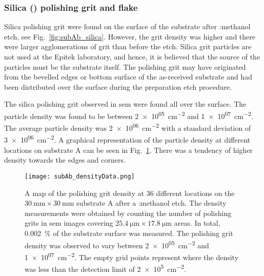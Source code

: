 \subsubsection{Silica () polishing grit and flake}

Silica polishing grit were found on the surface of the substrate after :methanol etch, see Fig.~\ref{fig:subAb_silica}. However, the grit density was higher and there were larger agglomerations of grit than before the etch. Silica grit particles are not used at the Epitek laboratory, and hence, it is believed that the source of the particles must be the substrate itself. The polishing grit may have originated from the bevelled edges or bottom surface of the as-received substrate and had been distributed over the surface during the preparation etch procedure.


The silica polishing grit observed in \ac{sem} were found all over the surface. The particle density was found to be between \SI{2e+05}{\centi\metre^{-2}} and \SI{1e+07}{\centi\metre^{-2}}. The average particle density was \SI{2e+06}{\centi\metre^{-2}} with a standard deviation of \SI{3e+06}{\centi\metre^{-2}}. A graphical representation of the particle density at different locations on substrate A can be seen in Fig.~\ref{fig:subAb_densityData}. There was a tendency of higher density towards the edges and corners.

\begin{figure}[htbp]
    \centering
    \texttt{[image: subAb\_densityData.png]}
    \caption[Map of the polishing grit density on substrate A after a :methanol etch.]{A map of the polishing grit density at 36 different locations on the $\SI{30}{\milli\metre}\times\SI{30}{\milli\metre}$ substrate A after a :methanol etch. The density measurements were obtained by counting the number of polishing grits in \ac{sem} images covering $\SI{25.4}{\micro\metre}\times\SI{17.8}{\micro\metre}$ areas. In total, \SI{0.002}{\percent} of the substrate surface was measured. The polishing grit density was observed to vary between \SI{2e+05}{\centi\metre^{-2}} and \SI{1e+07}{\centi\metre^{-2}}. The empty grid points represent where the density was less than the detection limit of \SI{2e+5}{\centi\metre^{-2}}.}
    \label{fig:subAb_densityData}
\end{figure}

